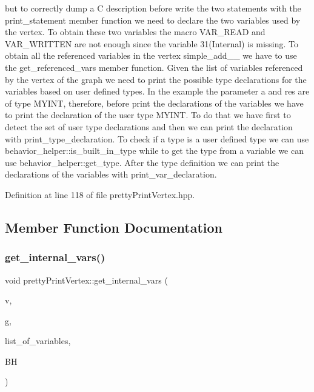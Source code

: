 but to correctly dump a C description before write the two statements with the print\+\_\+statement member function we need to declare the two variables used by the vertex. To obtain these two variables the macro V\+A\+R\+\_\+\+R\+E\+AD and V\+A\+R\+\_\+\+W\+R\+I\+T\+T\+EN are not enough since the variable 31(Internal) is missing. To obtain all the referenced variables in the vertex simple\+\_\+add\+\_\+\_ we have to use the get\+\_\+referenced\+\_\+vars member function. Given the list of variables referenced by the vertex of the graph we need to print the possible type declarations for the variables based on user defined types. In the example the parameter a and res are of type M\+Y\+I\+NT, therefore, before print the declarations of the variables we have to print the declaration of the user type M\+Y\+I\+NT. To do that we have first to detect the set of user type declarations and then we can print the declaration with print\+\_\+type\+\_\+declaration. To check if a type is a user defined type we can use behavior\+\_\+helper\+::is\+\_\+built\+\_\+in\+\_\+type while to get the type from a variable we can use behavior\+\_\+helper\+::get\+\_\+type. After the type definition we can print the declarations of the variables with print\+\_\+var\+\_\+declaration. 

Definition at line 118 of file pretty\+Print\+Vertex.\+hpp.



\subsection{Member Function Documentation}
\mbox{\label{structprettyPrintVertex_a0b7c685362aca7a4cd5f0944c5f9e326}} 
\subsubsection{\texorpdfstring{get\+\_\+internal\+\_\+vars()}{get\_internal\_vars()}}
{\footnotesize\ttfamily void pretty\+Print\+Vertex\+::get\+\_\+internal\+\_\+vars (\begin{DoxyParamCaption}\item[{const \hyperlink{graph_8hpp_abefdcf0544e601805af44eca032cca14}{vertex} \&}]{v,  }\item[{const \hyperlink{op__graph_8hpp_a9a0b240622c47584bee6951a6f5de746}{Op\+Graph\+Const\+Ref}}]{g,  }\item[{\hyperlink{classCustomUnorderedSet}{Custom\+Unordered\+Set}$<$ unsigned int $>$ \&}]{list\+\_\+of\+\_\+variables,  }\item[{const \hyperlink{behavioral__helper_8hpp_aae973b54cac87eef3b27442aa3e1e425}{Behavioral\+Helper\+Const\+Ref}}]{BH }\end{DoxyParamCaption})\hspace{0.3cm}{\ttfamily [static]}}



